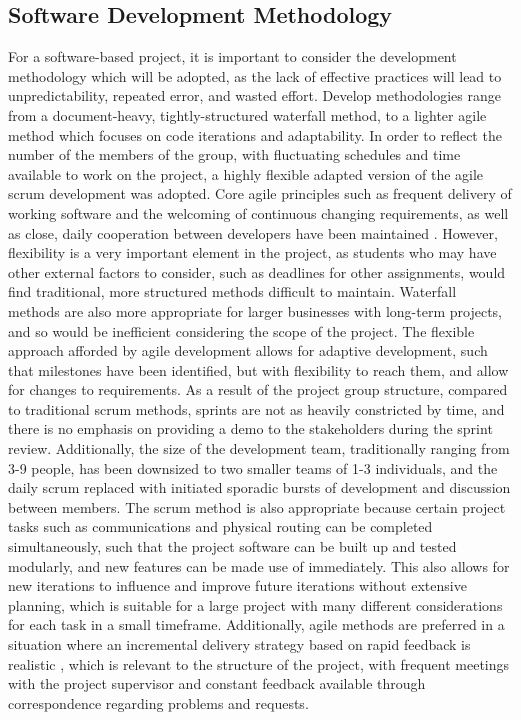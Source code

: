 		\subsection{Software Development Methodology}
For a software-based project, it is important to consider the development methodology which will be adopted, as the lack of effective practices will lead to unpredictability, repeated error, and wasted effort. Develop methodologies range from a document-heavy, tightly-structured waterfall method, to a lighter agile method which focuses on code iterations and adaptability. In order to reflect the number of the members of the group, with fluctuating schedules and time available to work on the project, a highly flexible adapted version of the agile scrum development was adopted. Core agile principles such as frequent delivery of working software and the welcoming of continuous changing requirements, as well as close, daily cooperation between developers have been maintained \cite{robertmartin2003}. However, flexibility is a very important element in the project, as students who may have other external factors to consider, such as deadlines for other assignments, would find traditional, more structured methods difficult to maintain. Waterfall methods are also more appropriate for larger businesses with long-term projects, and so would be inefficient considering the scope of the project.
The flexible approach afforded by agile development allows for adaptive development, such that milestones have been identified, but with flexibility to reach them, and allow for changes to requirements. As a result of the project group structure, compared to traditional scrum methods, sprints are not as heavily constricted by time, and there is no emphasis on providing a demo to the stakeholders during the sprint review. Additionally, the size of the development team, traditionally ranging from 3-9 people, has been downsized to two smaller teams of 1-3 individuals, and the daily scrum replaced with initiated sporadic bursts of development and discussion between members.
The scrum method is also appropriate because certain project tasks such as communications and physical routing can be completed simultaneously, such that the project software can be built up and tested modularly, and new features can be made use of immediately. This also allows for new iterations to influence and improve future iterations without extensive planning, which is suitable for a large project with many different considerations for each task in a small timeframe. Additionally, agile methods are preferred in a situation where an incremental delivery strategy based on rapid feedback is realistic \cite{iansommerville2010}, which is relevant to the structure of the project, with frequent meetings with the project supervisor and constant feedback available through correspondence regarding problems and requests.
